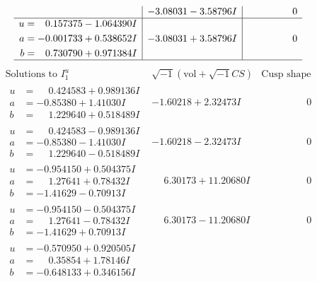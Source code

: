 \documentclass[1p]{elsarticle_modified}
\theoremstyle{definition}
\newcommand{\I}{\sqrt{-1}}
\begin{document}
$$\begin{array}{c|c|c}
 & -3.08031 - 3.58796 I & \phantom{-0.000000 } 0 \\ \hline\begin{aligned}
u &= \phantom{-}0.157375 - 1.064390 I \\
a &= -0.001733 + 0.538652 I \\
b &= \phantom{-}0.730790 + 0.971384 I\end{aligned}
 & -3.08031 + 3.58796 I & \phantom{-0.000000 } 0\\
 \hline 
 \end{array}$$\newpage$$\begin{array}{c|c|c}  
\text{Solutions to }I^u_{1}& \I (\text{vol} + \sqrt{-1}CS) & \text{Cusp shape}\\
 \hline 
\begin{aligned}
u &= \phantom{-}0.424583 + 0.989136 I \\
a &= -0.85380 + 1.41030 I \\
b &= \phantom{-}1.229640 + 0.518489 I\end{aligned}
 & -1.60218 + 2.32473 I & \phantom{-0.000000 } 0 \\ \hline\begin{aligned}
u &= \phantom{-}0.424583 - 0.989136 I \\
a &= -0.85380 - 1.41030 I \\
b &= \phantom{-}1.229640 - 0.518489 I\end{aligned}
 & -1.60218 - 2.32473 I & \phantom{-0.000000 } 0 \\ \hline\begin{aligned}
u &= -0.954150 + 0.504375 I \\
a &= \phantom{-}1.27641 + 0.78432 I \\
b &= -1.41629 - 0.70913 I\end{aligned}
 & \phantom{-}6.30173 + 11.20680 I & \phantom{-0.000000 } 0 \\ \hline\begin{aligned}
u &= -0.954150 - 0.504375 I \\
a &= \phantom{-}1.27641 - 0.78432 I \\
b &= -1.41629 + 0.70913 I\end{aligned}
 & \phantom{-}6.30173 - 11.20680 I & \phantom{-0.000000 } 0 \\ \hline\begin{aligned}
u &= -0.570950 + 0.920505 I \\
a &= \phantom{-}0.35854 + 1.78146 I \\
b &= -0.648133 + 0.346156 I\end{aligned}

\end{array}$$
\end{document}
